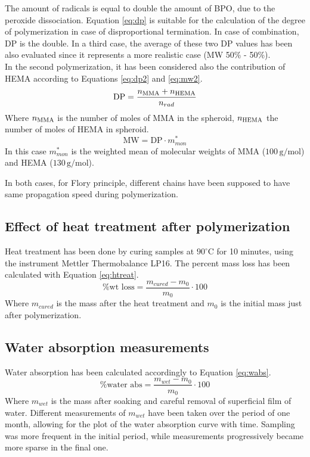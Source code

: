 \documentclass[a4paper, 11pt]{article}
\begin{document}
\newpage
The amount of radicals is equal to double the amount of BPO, due to the peroxide dissociation. Equation \ref{eq:dp} is suitable for the calculation of the degree of polymerization in case of disproportional termination. In case of combination, DP is the double. In a third case, the average of these two DP values has been also evaluated since it represents a more realistic case (MW 50\% - 50\%).\\
In the second polymerization, it has been considered also the contribution of HEMA according to Equations \ref{eq:dp2} and \ref{eq:mw2}.
\begin{equation}
\text{DP} = \frac{n_\textup{MMA} + n_\textup{HEMA}}{n_{rad}}
\label{eq:dp2} 
\end{equation}
Where $n_\textup{MMA}$ is the number of moles of MMA in the spheroid, $n_\textup{HEMA}$ the number of moles of HEMA in spheroid.
\begin{equation}
\text{MW} = \text{DP}\cdot m^*_{mon}
\label{eq:mw2} 
\end{equation}
In this case $m^*_{mon}$ is the weighted mean of molecular weights of MMA ($100\,\text{g/mol}$) and HEMA ($130\,\text{g/mol}$). \par 
In both cases, for Flory principle, different chains have been supposed to have same propagation speed during polymerization. 

\subsection{Effect of heat treatment after polymerization}

Heat treatment has been done by curing samples at $90^\circ$C for 10 minutes, using the instrument Mettler Thermobalance LP16. The percent mass loss has been calculated with Equation \ref{eq:htreat}.
\begin{equation}
\%\text{wt loss} = \frac{m_{cured}-m_0}{m_0}\cdot 100
\label{eq:htreat} 
\end{equation}
Where $m_{cured}$ is the mass after the heat treatment and $m_0$ is the initial mass just after polymerization. 

\subsection{Water absorption measurements}

Water absorption has been calculated accordingly to Equation \ref{eq:wabs}.
\begin{equation}
\%\text{water abs} = \frac{m_{wet}-m_0}{m_0}\cdot 100
\label{eq:wabs} 
\end{equation}
Where $m_{wet}$ is the mass after soaking and careful removal of superficial film of water. Different measurements of $m_{wet}$ have been taken over the period of one month, allowing for the plot of the water absorption curve with time. Sampling was more frequent in the initial period, while measurements progressively became more sparse in the final one. 
\end{document}
